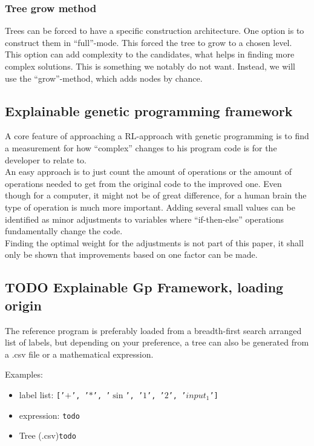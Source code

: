 \subsubsection{Tree grow method}
Trees can be forced to have a specific construction architecture. One option is to construct them in ``full''-mode. This forced the tree to grow to a chosen level.\\
This option can add complexity to the candidates, what helps in finding more complex solutions. This is something we notably do not want. Instead, we will use the ``grow''-method, which adds nodes by chance.

\subsection{Explainable genetic programming framework}
A core feature of approaching a RL-approach with genetic programming is to find a measurement for how ``complex'' changes to his program code is for the developer to relate to.\\
An easy approach is to just count the amount of operations or the amount of operations needed to get from the original code to the improved one. Even though for a computer, it might not be of great difference, for a human brain the type of operation is much more important. Adding several small values can be identified as minor adjustments to variables where ``if-then-else'' operations fundamentally change the code.\\
Finding the optimal weight for the adjustments is not part of this paper, it shall only be shown that improvements based on one factor can be made.\\

\subsection{TODO Explainable Gp Framework, loading origin}

The reference program is preferably loaded from a breadth-first search arranged list of labels, but depending on your preference, a tree can also be generated from a {.csv} file or a mathematical expression. 

Examples:
\begin{itemize}
\item label list: \tt{['$+$', '$*$', '$\sin$', '$1$', '$2$', '$input_1$']} 
\item expression: \tt{todo}
\item Tree ({.csv})\tt{todo}
\end{itemize}

